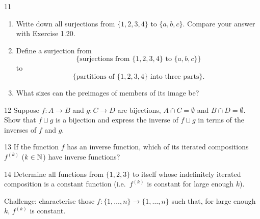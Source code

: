 \begin{exercise}{11}
    \begin{enumerate}[label=(\alph*)]
        \item Write down all surjections from $\{1,2,3,4\}$ to $\{a,b,c\}$.
              Compare your answer with Exercise 1.20.
        \item Define a surjection from
              \[
                  \{\text{surjections from } \{1,2,3,4\} \text{ to } \{a,b,c\}\}
              \]
              to
              \[
                  \{\text{partitions of } \{1,2,3,4\} \text{ into three parts}\}.
              \]
        \item What sizes can the preimages of members of its image be?
    \end{enumerate}
\end{exercise}
\begin{solbox}
\begin{solution}

\end{solution}
\end{solbox}

\begin{exercise}{12}
    Suppose $f:A\to B$ and $g:C\to D$ are bijections, $A\cap C=\emptyset$ and
    $B\cap D=\emptyset$. Show that $f\sqcup g$ is a bijection and express the
    inverse of $f\sqcup g$ in terms of the inverses of $f$ and $g$.
\end{exercise}
\begin{solbox}
\begin{solution}

\end{solution}
\end{solbox}

\begin{exercise}{13}
    If the function $f$ has an inverse function, which of its iterated
    compositions $f^{(k)}$ ($k\in\mathbb{N}$) have inverse functions?
\end{exercise}
\begin{solbox}
\begin{solution}

\end{solution}
\end{solbox}

\begin{exercise}{14}
    Determine all functions from $\{1,2,3\}$ to itself whose indefinitely
    iterated composition is a constant function (i.e.\ $f^{(k)}$ is constant for
    large enough $k$).

    Challenge: characterise those $f:\{1,\dots,n\}\to\{1,\dots,n\}$ such that, for
    large enough $k$, $f^{(k)}$ is constant.
\end{exercise}
\begin{solbox}
\begin{solution}

\end{solution}
\end{solbox}

